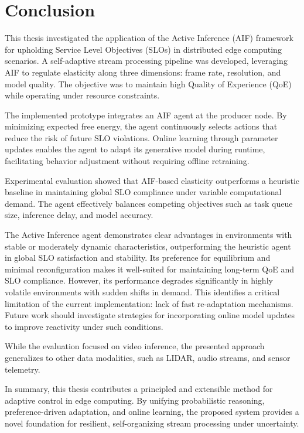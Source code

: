 \chapter{Conclusion}
\label{chap:conclusion}

This thesis investigated the application of the Active Inference (AIF) framework for upholding Service Level Objectives (SLOs) in distributed edge computing scenarios. A self-adaptive stream processing pipeline was developed, leveraging AIF to regulate elasticity along three dimensions: frame rate, resolution, and model quality. The objective was to maintain high Quality of Experience (QoE) while operating under resource constraints.

The implemented prototype integrates an AIF agent at the producer node. By minimizing expected free energy, the agent continuously selects actions that reduce the risk of future SLO violations. Online learning through parameter updates enables the agent to adapt its generative model during runtime, facilitating behavior adjustment without requiring offline retraining.

Experimental evaluation showed that AIF-based elasticity outperforms a heuristic baseline in maintaining global SLO compliance under variable computational demand. The agent effectively balances competing objectives such as task queue size, inference delay, and model accuracy.

The Active Inference agent demonstrates clear advantages in environments with stable or moderately dynamic characteristics, outperforming the heuristic agent in global SLO satisfaction and stability. Its preference for equilibrium and minimal reconfiguration makes it well-suited for maintaining long-term QoE and SLO compliance. However, its performance degrades significantly in highly volatile environments with sudden shifts in demand. This identifies a critical limitation of the current implementation: lack of fast re-adaptation mechanisms. Future work should investigate strategies for incorporating online model updates to improve reactivity under such conditions.

While the evaluation focused on video inference, the presented approach generalizes to other data modalities, such as LIDAR, audio streams, and sensor telemetry. 

In summary, this thesis contributes a principled and extensible method for adaptive control in edge computing. By unifying probabilistic reasoning, preference-driven adaptation, and online learning, the proposed system provides a novel foundation for resilient, self-organizing stream processing under uncertainty.
